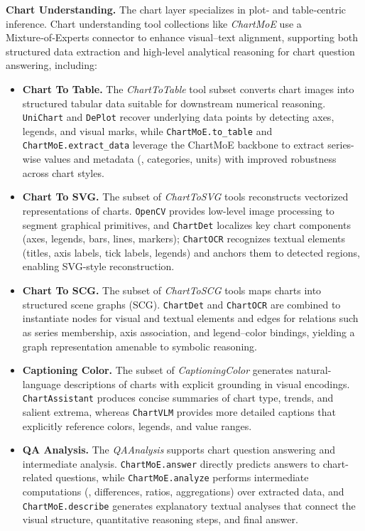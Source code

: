 \noindent \textbf{Chart Understanding.}
The chart layer specializes in plot‑ and table‑centric inference. Chart understanding tool collections like \emph{ChartMoE} use a Mixture‑of‑Experts connector to enhance visual–text alignment, supporting both structured data extraction and high‑level analytical reasoning for chart question answering, including:
\begin{itemize}
    \item \textbf{Chart To Table.}
The \emph{ChartToTable} tool subset converts chart images into structured tabular data suitable for downstream numerical reasoning. 
\texttt{UniChart} and \texttt{DePlot} recover underlying data points by detecting axes, legends, and visual marks, while \texttt{ChartMoE.to\_table} and \texttt{ChartMoE.extract\_data} leverage the ChartMoE backbone to extract series-wise values and metadata (\eg, categories, units) with improved robustness across chart styles.

\item \textbf{Chart To SVG.}
The subset of \emph{ChartToSVG} tools reconstructs vectorized representations of charts. 
\texttt{OpenCV} provides low-level image processing to segment graphical primitives, and \texttt{ChartDet} localizes key chart components (axes, legends, bars, lines, markers); \texttt{ChartOCR} recognizes textual elements (titles, axis labels, tick labels, legends) and anchors them to detected regions, enabling SVG-style reconstruction.

\item \textbf{Chart To SCG.}
The subset of \emph{ChartToSCG} tools maps charts into structured scene graphs (SCG). 
\texttt{ChartDet} and \texttt{ChartOCR} are combined to instantiate nodes for visual and textual elements and edges for relations such as series membership, axis association, and legend–color bindings, yielding a graph representation amenable to symbolic reasoning.

    \item \textbf{Captioning Color.}
The subset of \emph{CaptioningColor} generates natural-language descriptions of charts with explicit grounding in visual encodings. 
\texttt{ChartAssistant} produces concise summaries of chart type, trends, and salient extrema, whereas \texttt{ChartVLM} provides more detailed captions that explicitly reference colors, legends, and value ranges.

    \item \textbf{QA Analysis.}
The \emph{QAAnalysis} supports chart question answering and intermediate analysis. 
\texttt{ChartMoE.answer} directly predicts answers to chart-related questions, while \texttt{ChartMoE.analyze} performs intermediate computations (\eg, differences, ratios, aggregations) over extracted data, and \texttt{ChartMoE.describe} generates explanatory textual analyses that connect the visual structure, quantitative reasoning steps, and final answer.
\end{itemize}

